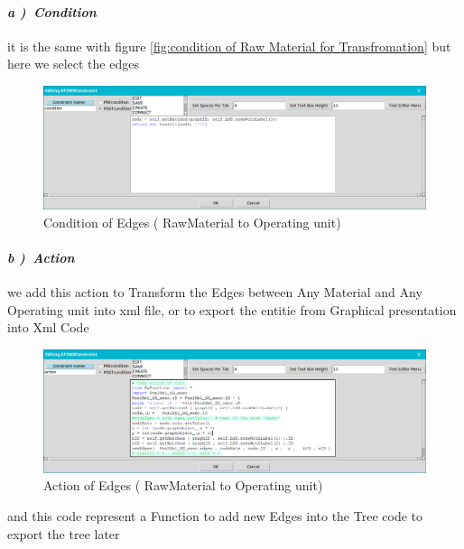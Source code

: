 \paragraph{\emph{ a )~Condition } } it is the same with figure \ref{fig:condition of Raw Material for Transfromation} but here we select the edges

\vspace{1cm} 
\begin{figure}[th]
	\centering %
 	\includegraphics[scale=0.38]{ch3/img/xcond2}
	\caption{\label{fig:Condition2)}Condition of Edges ( RawMaterial to Operating unit)}
 \end{figure} 
\vspace{1cm}
\paragraph{\emph{ b )~Action } } we add this action to Transform the Edges between Any Material and Any Operating unit into xml file, or to export the entitie from Graphical presentation 
into Xml Code 
\vspace{0.7cm}
\begin{figure}[th]
	\centering %
 	\includegraphics[scale=0.38]{ch3/img/xact2}
	\caption{\label{fig:action2)}Action of Edges ( RawMaterial to Operating unit)}
\end{figure} 

and this code represent a Function to add new Edges into the Tree code 
to export the tree later 
 
